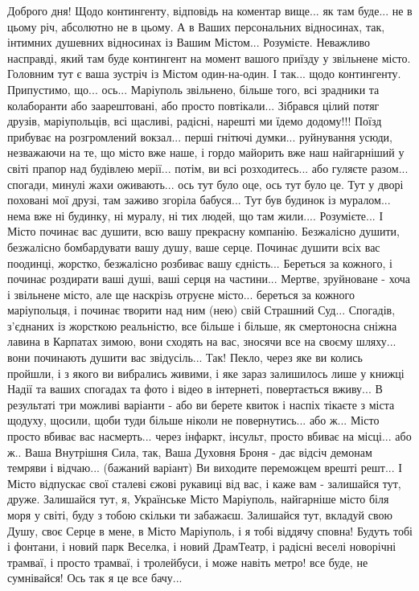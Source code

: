 


Доброго дня! Щодо контингенту, відповідь на коментар вище... як там буде... не
в цьому річ, абсолютно не в цьому. А в Ваших персональних відносинах, так,
інтимних душевних відносинах із Вашим Містом... Розумієте. Неважливо насправді,
який там буде контингент на момент вашого приїзду у звільнене місто. Головним
тут є ваша зустріч із Містом один-на-один.  І так... щодо контингенту.
Припустимо, що... ось...  Маріуполь звільнено, більше того, всі зрадники та
колаборанти або заарештовані, або просто повтікали...  Зібрався цілий потяг
друзів, маріупольців, всі щасливі, радісні, нарешті ми їдемо додому!!! Поїзд
прибуває на розгромлений вокзал...  перші гнітючі думки... руйнування усюди,
незважаючи на те, що місто вже наше, і гордо майорить вже наш найгарніший у
світі прапор над будівлею мерії... потім, ви всі розходитесь... або гуляєте
разом...  спогади, минулі жахи оживають... ось тут було оце, ось тут було це.
Тут у дворі поховані мої друзі, там заживо згоріла бабуся... Тут був будинок із
муралом...  нема вже ні будинку, ні муралу, ні тих людей, що там жили....
Розумієте...  І Місто починає вас душити, всю вашу прекрасну компанію.
Безжалісно душити, безжалісно бомбардувати вашу душу, ваше серце. Починає
душити всіх вас поодинці, жорстко, безжалісно розбиває вашу єдність... Береться
за кожного, і починає роздирати ваші душі, ваші серця на частини... Мертве,
зруйноване - хоча і звільнене місто, але ще наскрізь отруєне місто... береться
за кожного маріупольця, і починає творити над ним (нею) свій Страшний Суд...
Спогадів, з'єднаних із жорсткою реальністю, все більше і більше, як смертоносна
сніжна лавина в Карпатах зимою, вони сходять на вас, зносячи все на своєму
шляху... вони починають душити вас звідусіль...  Так!  Пекло, через яке ви
колись пройшли, і з якого ви вибрались живими, і яке зараз залишилось лише у
книжці Надії та ваших спогадах та фото і відео в інтернеті, повертається
вживу... В результаті три можливі варіанти - або ви берете квиток і наспіх
тікаєте з міста щодуху, щосили, щоби туди більше ніколи не повернутись... або
ж...  Місто просто вбиває вас насмерть...  через інфаркт, інсульт, просто
вбиває на місці... або ж.. Ваша Внутрішня Сила, так, Ваша Духовня Броня - дає
відсіч демонам темряви і відчаю... (бажаний варіант) Ви виходите переможцем
врешті решт... І Місто відпускає свої сталеві єжові рукавиці від вас, і каже
вам - залишайся тут, друже. Залишайся тут, я, Українське Місто Маріуполь,
найгарніше місто біля моря у світі, буду з тобою скільки ти забажаєш. Залишайся
тут, вкладуй свою Душу, своє Серце в мене, в Місто Маріуполь, і я тобі віддячу
сповна! Будуть тобі і фонтани, і новий парк Веселка, і новий ДрамТеатр, і
радісні веселі новорічні трамваї, і просто трамваї, і тролейбуси, і може навіть
метро! все буде, не сумнівайся! Ось так я це все бачу...

